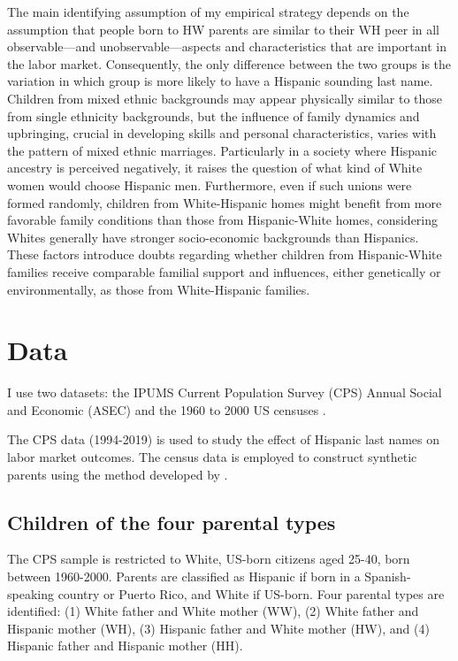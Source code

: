 \documentclass[a4paper,fleqn]{cas-sc}
\begin{document}
The main identifying assumption of my empirical strategy depends on the assumption that people born to HW parents are similar to their WH peer in all observable---and unobservable---aspects and characteristics that are important in the labor market. Consequently, the only difference between the two groups is the variation in which group is more likely to have a Hispanic sounding last name. Children from mixed ethnic backgrounds may appear physically similar to those from single ethnicity backgrounds, but the influence of family dynamics and upbringing, crucial in developing skills and personal characteristics, varies with the pattern of mixed ethnic marriages. Particularly in a society where Hispanic ancestry is perceived negatively, it raises the question of what kind of White women would choose Hispanic men. Furthermore, even if such unions were formed randomly, children from White-Hispanic homes might benefit from more favorable family conditions than those from Hispanic-White homes, considering Whites generally have stronger socio-economic backgrounds than Hispanics. These factors introduce doubts regarding whether children from Hispanic-White families receive comparable familial support and influences, either genetically or environmentally, as those from White-Hispanic families.

\section{Data}\label{sec:data}

I use two datasets: the IPUMS Current Population Survey (CPS) Annual Social and Economic (ASEC) \citep{cps2019} and the 1960 to 2000 US censuses \citep{acs2019}.

The CPS data (1994-2019) is used to study the effect of Hispanic last names on labor market outcomes. The census data is employed to construct synthetic parents using the method developed by \citet{rubinstein2014pride}.

\subsection{Children of the four parental types}

The CPS sample is restricted to White, US-born citizens aged 25-40, born between 1960-2000. Parents are classified as Hispanic if born in a Spanish-speaking country or Puerto Rico, and White if US-born. Four parental types are identified: (1) White father and White mother (WW), (2) White father and Hispanic mother (WH), (3) Hispanic father and White mother (HW), and (4) Hispanic father and Hispanic mother (HH).
\end{document}
